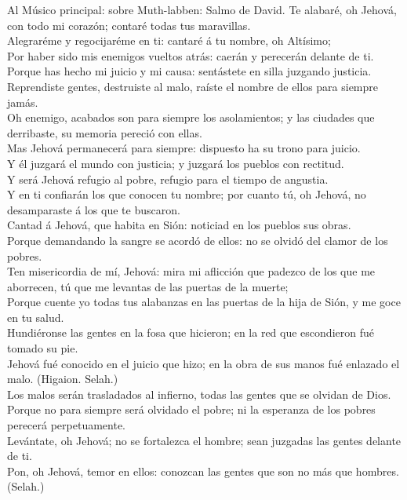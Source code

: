  Al Músico principal: sobre Muth-labben: Salmo de David.
Te alabaré, oh Jehová, con todo mi corazón; contaré todas tus
maravillas.\\
 Alegraréme y regocijaréme en ti: cantaré á tu nombre, oh
Altísimo;\\
 Por haber sido mis enemigos vueltos atrás: caerán y
perecerán delante de ti.\\
 Porque has hecho mi juicio y mi causa: sentástete en
silla juzgando justicia.\\
 Reprendiste gentes, destruiste al malo, raíste el nombre
de ellos para siempre jamás.\\
 Oh enemigo, acabados son para siempre los asolamientos; y
las ciudades que derribaste, su memoria pereció con ellas.\\
 Mas Jehová permanecerá para siempre: dispuesto ha su
trono para juicio.\\
 Y él juzgará el mundo con justicia; y juzgará los pueblos
con rectitud.\\
 Y será Jehová refugio al pobre, refugio para el tiempo de
angustia.\\
 Y en ti confiarán los que conocen tu nombre; por cuanto
tú, oh Jehová, no desamparaste á los que te buscaron.\\
 Cantad á Jehová, que habita en Sión: noticiad en los
pueblos sus obras.\\
 Porque demandando la sangre se acordó de ellos: no se
olvidó del clamor de los pobres.\\
 Ten misericordia de mí, Jehová: mira mi aflicción que
padezco de los que me aborrecen, tú que me levantas de las puertas de la
muerte;\\
 Porque cuente yo todas tus alabanzas en las puertas de
la hija de Sión, y me goce en tu salud.\\
 Hundiéronse las gentes en la fosa que hicieron; en la
red que escondieron fué tomado su pie.\\
 Jehová fué conocido en el juicio que hizo; en la obra de
sus manos fué enlazado el malo. (Higaion. Selah.)\\
 Los malos serán trasladados al infierno, todas las
gentes que se olvidan de Dios.\\
 Porque no para siempre será olvidado el pobre; ni la
esperanza de los pobres perecerá perpetuamente.\\
 Levántate, oh Jehová; no se fortalezca el hombre; sean
juzgadas las gentes delante de ti.\\
 Pon, oh Jehová, temor en ellos: conozcan las gentes que
son no más que hombres. (Selah.)

